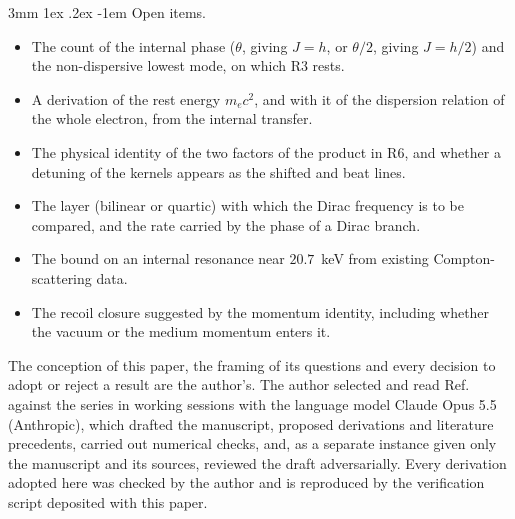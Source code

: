 \documentclass[%
 reprint, amsmath,amssymb, aps, prb, ]{revtex4-2}
\makeatletter
\numberwithin{equation}{section}
\renewcommand\paragraph{%
  \@startsection{paragraph}{4}{\z@}%
    {3mm \@plus 1ex \@minus .2ex}%
    {-1em}%
    {\normalfont\normalsize\itshape}}
\newcommand{\iphase}{\theta}  %
\makeatother
\begin{document}
\paragraph{Open items.}
\begin{itemize}[leftmargin=2.4em]
\item[O1.] The count of the internal phase ($\iphase$, giving $J = h$, or $\iphase/2$, giving $J = h/2$) and the non-dispersive lowest mode, on which R3 rests.
\item[O2.] A derivation of the rest energy $m_ec^2$, and with it of the dispersion relation of the whole electron, from the internal transfer.
\item[O3.] The physical identity of the two factors of the product in R6, and whether a detuning of the kernels appears as the shifted and beat lines.
\item[O4.] The layer (bilinear or quartic) with which the Dirac frequency is to be compared, and the rate carried by the phase of a Dirac branch.
\item[O5.] The bound on an internal resonance near $20.7$~keV from existing Compton-scattering data.
\item[O6.] The recoil closure suggested by the momentum identity, including whether the vacuum or the medium momentum enters it.
\end{itemize}

\begin{acknowledgments}
The conception of this paper, the framing of its questions and every decision to adopt or reject a result are the author's. The author selected and read Ref.~\cite{Yukawa1954} against the series in working sessions with the language model Claude Opus 5.5 (Anthropic), which drafted the manuscript, proposed derivations and literature precedents, carried out numerical checks, and, as a separate instance given only the manuscript and its sources, reviewed the draft adversarially. Every derivation adopted here was checked by the author and is reproduced by the verification script deposited with this paper.
\end{acknowledgments}
\end{document}
